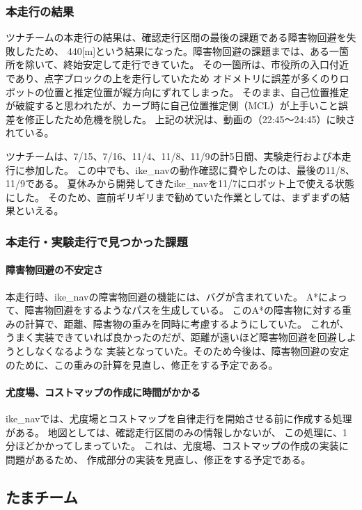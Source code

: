\documentclass[twocolumn,9pt]{jsproceedings}
\begin{document}
\subsubsection{本走行の結果}
ツナチームの本走行の結果は、確認走行区間の最後の課題である障害物回避を失敗したため、
440[m]という結果になった。障害物回避の課題までは、ある一箇所を除いて、終始安定して走行できていた。
その一箇所は、市役所の入口付近であり、点字ブロックの上を走行していたため
オドメトリに誤差が多くのりロボットの位置と推定位置が縦方向にずれてしまった。
そのまま、自己位置推定が破綻すると思われたが、カーブ時に自己位置推定側（MCL）が上手いこと誤差を修正したため危機を脱した。
上記の状況は、動画\cite{ike_nav_loc_youtube}の（22:45〜24:45）に映されている。

ツナチームは、7/15、7/16、11/4、11/8、11/9の計5日間、実験走行および本走行に参加した。
この中でも、ike\_navの動作確認に費やしたのは、最後の11/8、11/9である。
夏休みから開発してきたike\_navを11/7にロボット上で使える状態にした。
そのため、直前ギリギリまで勧めていた作業としては、まずまずの結果といえる。

\subsubsection{本走行・実験走行で見つかった課題}
\paragraph{障害物回避の不安定さ}
本走行時、ike\_navの障害物回避の機能には、バグが含まれていた。
A*によって、障害物回避をするようなパスを生成している。
このA*の障害物に対する重みの計算で、距離、障害物の重みを同時に考慮するようにしていた。
これが、うまく実装できていれば良かったのだが、距離が遠いほど障害物回避を回避しようとしなくなるような
実装となっていた。そのため今後は、障害物回避の安定のために、この重みの計算を見直し、修正をする予定である。

\paragraph{尤度場、コストマップの作成に時間がかかる}
ike\_navでは、尤度場とコストマップを自律走行を開始させる前に作成する処理がある。
地図としては、確認走行区間のみの情報しかないが、
この処理に、1分ほどかかってしまっていた。
これは、尤度場、コストマップの作成の実装に問題があるため、
作成部分の実装を見直し、修正をする予定である。

\subsection{たまチーム}
\end{document}
